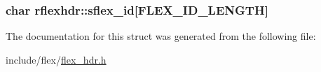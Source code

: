 \subsubsection[{\texorpdfstring{sflex\+\_\+id}{sflex_id}}]{\setlength{\rightskip}{0pt plus 5cm}char rflexhdr\+::sflex\+\_\+id\mbox{[}{\bf F\+L\+E\+X\+\_\+\+I\+D\+\_\+\+L\+E\+N\+G\+TH}\mbox{]}}\hypertarget{structrflexhdr_aa79b53451e65228d567880e512cadc3e}{}\label{structrflexhdr_aa79b53451e65228d567880e512cadc3e}


The documentation for this struct was generated from the following file\+:\begin{DoxyCompactItemize}
\item 
include/flex/\hyperlink{flex__hdr_8h}{flex\+\_\+hdr.\+h}\end{DoxyCompactItemize}
